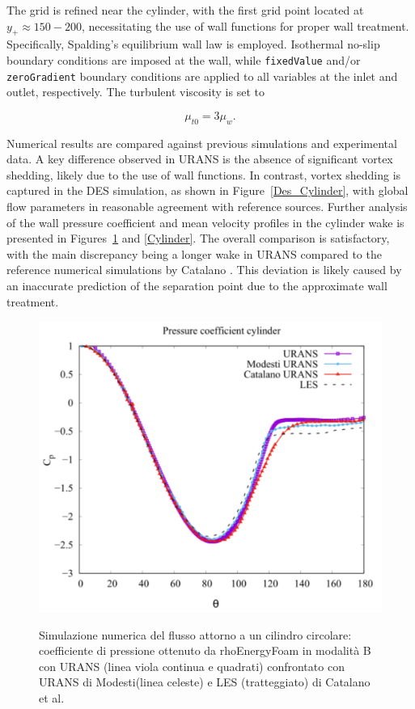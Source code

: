 \documentclass[a5paper]{sapthesis}
\begin{document}
	The grid is refined near the cylinder, with the first grid point located at \( y_+ \approx 150 - 200 \), necessitating the use of wall functions for proper wall treatment. Specifically, Spalding’s equilibrium wall law \cite{spalding1961single} is employed. Isothermal no-slip boundary conditions are imposed at the wall, while \texttt{fixedValue} and/or \texttt{zeroGradient} boundary conditions are applied to all variables at the inlet and outlet, respectively. The turbulent viscosity is set to 
	
	\begin{equation}
		\mu_{t0} = 3\mu_w.
	\end{equation}
	
	Numerical results are compared against previous simulations and experimental data. A key difference observed in URANS is the absence of significant vortex shedding, likely due to the use of wall functions. In contrast, vortex shedding is captured in the DES simulation, as shown in Figure~\ref{Des_Cylinder}, with global flow parameters in reasonable agreement with reference sources. Further analysis of the wall pressure coefficient and mean velocity profiles in the cylinder wake is presented in Figures~\ref{Cp_Cylinder} and \ref{Cylinder}. The overall comparison is satisfactory, with the main discrepancy being a longer wake in URANS compared to the reference numerical simulations by Catalano \cite{Catalano}. This deviation is likely caused by an inaccurate prediction of the separation point due to the approximate wall treatment.
	
	\begin{figure}[h]
		\begin{center}
			{\includegraphics[width=0.579\linewidth]{Figures/pressure_coeff_cylinder}}  
			\caption[Pressure coefficients for the URANS of the 2D cylinder]{Simulazione numerica del flusso attorno a un cilindro circolare: coefficiente di pressione ottenuto da rhoEnergyFoam in modalità B con URANS (linea viola continua e quadrati) confrontato con URANS di Modesti(linea celeste) e LES (tratteggiato) di Catalano et al. \cite{Catalano}}
			\label{Cp_Cylinder}
		\end{center}
	\end{figure}
	
\end{document}
